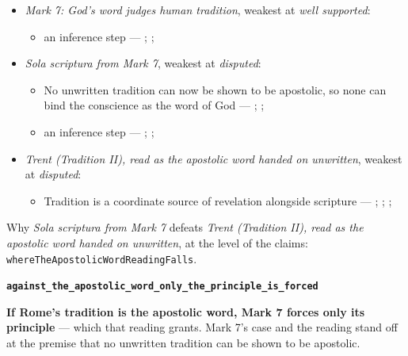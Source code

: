 \documentclass[11pt]{article}
\begin{document}
\begin{itemize}
\item \emph{Mark 7: God’s word judges human tradition}, weakest at \emph{well supported}:
\begin{itemize}
\item an inference step --- \cite[Vatican II (1965), Dei Verbum 10]{tanner-decrees-1990}; \cite[IV.x.23]{calvin-institutes-1960}; \cite[15--16]{wenham-our-lords-view-1953}
\end{itemize}
\item \emph{Sola scriptura from Mark 7}, weakest at \emph{disputed}:
\begin{itemize}
\item No unwritten tradition can now be shown to be apostolic, so none can bind the conscience as the word of God --- \cite[503--511]{whitaker-disputation-1849}; \cite[594]{whitaker-disputation-1849}; \cite[I.6]{westminster-confession-1647}
\item an inference step --- \cite{geiselmann-meaning-of-tradition-1966}; \cite[Vatican I (1870), Pastor Aeternus, ch. 4]{tanner-decrees-1990}; \cite{florovsky-bible-church-tradition-1972}
\end{itemize}
\item \emph{Trent (Tradition II), read as the apostolic word handed on unwritten}, weakest at \emph{disputed}:
\begin{itemize}
\item Tradition is a coordinate source of revelation alongside scripture --- \cite[Trent, Session IV (1546), Decree on Sacred Books and Traditions]{tanner-decrees-1990}; \cite{mathison-shape-sola-scriptura-2001}; \cite{geiselmann-meaning-of-tradition-1966}; \cite{congar-tradition-and-traditions-1966}
\end{itemize}
\end{itemize}
\noindent Why \emph{Sola scriptura from Mark 7} defeats \emph{Trent (Tradition II), read as the apostolic word handed on unwritten}, at the level of the claims: \texttt{where\allowbreak{}The\allowbreak{}Apostolic\allowbreak{}Word\allowbreak{}Reading\allowbreak{}Falls}.
\par\medskip\noindent\textbf{\texttt{against\_\allowbreak{}the\_\allowbreak{}apostolic\_\allowbreak{}word\_\allowbreak{}only\_\allowbreak{}the\_\allowbreak{}principle\_\allowbreak{}is\_\allowbreak{}forced}}\par\nobreak\noindent
\textbf{If Rome’s tradition is the apostolic word, Mark 7 forces only its principle} — which that reading grants. Mark 7’s case and the reading stand off at the premise that no unwritten tradition can be shown to be apostolic.
\end{document}
